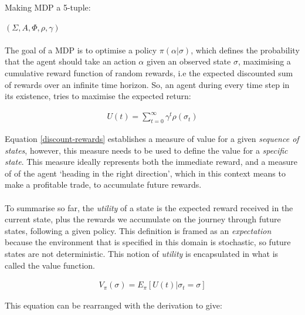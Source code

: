 \documentclass[ %
                    author={Ashwinder Khurana},
                supervisor={Prof Dave Cliff},
                    degree={MEng},
                     title={The Deeply Reinforced Trader},
                  subtitle={},
                      type={enterprise},
                      year={2020} ]{dissertation}
\begin{document}
\vspace{0.5cm}
\noindent
Making MDP a 5-tuple:{$(\Sigma,A, \Phi, \rho,\gamma)$
\\
\\

\noindent
The goal of a MDP is to optimise a policy $\pi(\alpha | \sigma)$, which defines the probability that the agent should take an action $\alpha$ given an observed state $\sigma$, maximising a cumulative reward function of random rewards, i.e the expected discounted sum of rewards over an infinite time horizon. So, an agent during every time step in its existence, tries to maximise the expected return:

\begin{equation}
\label{discount-rewards}
\begin{split}
U(t) = \sum\limits^{\infty}_{t=0}{\gamma^{t} \rho(\sigma_t)}
\end{split}
\end{equation}

\vspace{0.5cm}
\noindent
Equation \ref{discount-rewards} establishes a measure of value for a given \textit{sequence of states}, however, this measure needs to be used to define the value for a \textit{specific state}. This measure ideally represents both the immediate reward, and a measure of of the agent \enquote*{heading in the right direction}, which in this context means to make a profitable trade, to accumulate future rewards.
\\
\\
To summarise so far, the \textit{utility} of a state is the expected reward received in the current state, plus the rewards we accumulate on the journey through future states, following a given policy. This definition is framed as an \textit{expectation} because the environment that is specified in this domain is stochastic, so future states are not deterministic. This notion of \textit{utility} is encapsulated in what is called the value function. 

\begin{equation}
\label{expected-discounted-rewards}
\begin{split}
V_\pi (\sigma) = E_\pi [U(t) | \sigma_t = \sigma]
\end{split}
\end{equation}

\noindent 
This equation can be rearranged with the derivation\cite{rearrange-value-function https://www.jeremyjordan.me/markov-decision-process/} to give:

}
\end{document}

